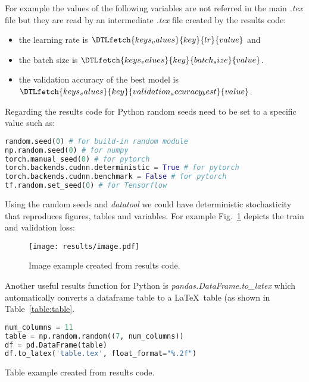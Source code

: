 \documentclass[journal]{IEEEtran}
\begin{document}
For example the values of the following variables are not referred in the main \textit{.tex} file but they are read by an intermediate \textit{.tex} file created by the results code:
\begin{itemize}
	\item the learning rate is $\DTLfetch{keys_values}{key}{lr}{value}$ and
	\item the batch size is $\DTLfetch{keys_values}{key}{batch_size}{value}$.
	\item the validation accuracy of the best model is $\DTLfetch{keys_values}{key}{validation_accuracy_best}{value}$.
\end{itemize}

Regarding the results code for Python random seeds need to be set to a specific value such as:
\begin{lstlisting}[language=python, style=lststyle, caption={Python reproducibility commands for some popular libraries.}, captionpos=b]
random.seed(0) # for build-in random module
np.random.seed(0) # for numpy
torch.manual_seed(0) # for pytorch
torch.backends.cudnn.deterministic = True # for pytorch
torch.backends.cudnn.benchmark = False # for pytorch
tf.random.set_seed(0) # for Tensorflow
\end{lstlisting}

Using the random seeds and \textit{datatool} we could have deterministic stochasticity that reproduces figures, tables and variables.
For example Fig.~\ref{fig:image} depicts the train and validation loss:
\begin{figure}[h]
	\texttt{[image: results/image.pdf]}
	\caption{Image example created from results code.}
	\label{fig:image}
\end{figure}

Another useful results function for Python is \textit{pandas.DataFrame.to\_latex} which automatically converts a dataframe table to a \LaTeX\ table (as shown in Table~\ref{table:table}.

\begin{lstlisting}[language=python, style=lststyle, caption={Convert Pandas DataFrame to \LaTeX\ table.}, captionpos=b]
num_columns = 11
table = np.random.random((7, num_columns))
df = pd.DataFrame(table)
df.to_latex('table.tex', float_format="%.2f")
\end{lstlisting}

\begin{table}[h]
	\centering
	\caption{Table example created from results code.}
	\label{table:table}
	\setlength\tabcolsep{4.2pt}
	
\end{table}



\end{document}
